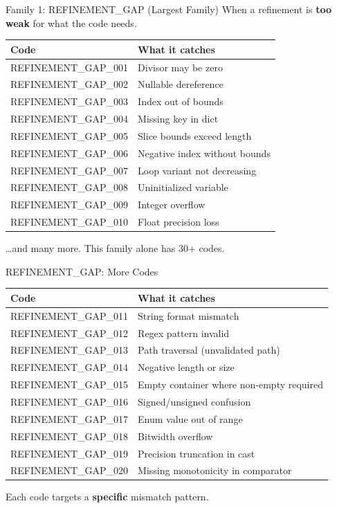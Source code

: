 \documentclass[aspectratio=169,10pt]{beamer}
\begin{document}
\begin{frame}{Family 1: REFINEMENT\_GAP (Largest Family)}
When a refinement is \textbf{too weak} for what the code needs.
\vspace{0.3em}
{\scriptsize
\begin{tabular}{@{}ll@{}}
\textbf{Code} & \textbf{What it catches} \\
\hline
REFINEMENT\_GAP\_001 & Divisor may be zero \\
REFINEMENT\_GAP\_002 & Nullable dereference \\
REFINEMENT\_GAP\_003 & Index out of bounds \\
REFINEMENT\_GAP\_004 & Missing key in dict \\
REFINEMENT\_GAP\_005 & Slice bounds exceed length \\
REFINEMENT\_GAP\_006 & Negative index without bounds \\
REFINEMENT\_GAP\_007 & Loop variant not decreasing \\
REFINEMENT\_GAP\_008 & Uninitialized variable \\
REFINEMENT\_GAP\_009 & Integer overflow \\
REFINEMENT\_GAP\_010 & Float precision loss \\
\end{tabular}}
\vspace{0.3em}
\ldots and many more. This family alone has 30+ codes.
\end{frame}

\begin{frame}{REFINEMENT\_GAP: More Codes}
{\scriptsize
\begin{tabular}{@{}ll@{}}
\textbf{Code} & \textbf{What it catches} \\
\hline
REFINEMENT\_GAP\_011 & String format mismatch \\
REFINEMENT\_GAP\_012 & Regex pattern invalid \\
REFINEMENT\_GAP\_013 & Path traversal (unvalidated path) \\
REFINEMENT\_GAP\_014 & Negative length or size \\
REFINEMENT\_GAP\_015 & Empty container where non-empty required \\
REFINEMENT\_GAP\_016 & Signed/unsigned confusion \\
REFINEMENT\_GAP\_017 & Enum value out of range \\
REFINEMENT\_GAP\_018 & Bitwidth overflow \\
REFINEMENT\_GAP\_019 & Precision truncation in cast \\
REFINEMENT\_GAP\_020 & Missing monotonicity in comparator \\
\end{tabular}}
\vspace{0.3em}
Each code targets a \textbf{specific} mismatch pattern.
\end{frame}
\end{document}
